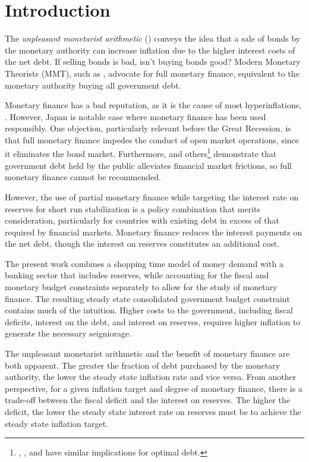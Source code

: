 \documentclass[]{article}
\begin{document}
\pagebreak

\onehalfspacing
\section{Introduction}
 
The \textit{unpleasant monetarist arithmetic} (\cite{sargent1981unpleasant}) conveys the idea that a sale of bonds by the monetary authority can increase inflation due to the higher interest costs of the net debt. If selling bonds is bad, isn't buying bonds good? Modern Monetary Theorists (MMT), such as \textcite{Kelton2020}, advocate for full monetary finance, equivalent to the monetary authority buying all government debt. 

Monetary finance has a bad reputation, as it is the cause of most hyperinflations, \textcite{sargent1982ends}. However, Japan is notable case where monetary finance has been used responsibly. One objection, particularly relevant before the Great Recession, is that full monetary finance impedes the conduct of open market operations, since it eliminates the bond market. Furthermore, \textcite{AIYAGARI98debt} and others\footnote{\textcite{Woodford90debt}, \textcite{Azzimonti2019debtwithbanks}, and \textcite{brunnermeier24safe} have similar implications for optimal debt.} demonstrate that government debt held by the public alleviates financial market frictions, so full monetary finance cannot be recommended.

However, the use of partial monetary finance while targeting the interest rate on reserves for short run stabilization is a policy combination that merits consideration, particularly for countries with existing debt in excess of that required by financial markets. Monetary finance reduces the interest payments on the net debt, though the interest on reserves constitutes an additional cost. 

The present work combines a shopping time model of money demand with a banking sector that includes reserves, while accounting for the fiscal and monetary budget constraints separately to allow for the study of monetary finance. The resulting steady state consolidated government budget constraint contains much of the intuition. Higher costs to the government, including fiscal deficits, interest on the debt, and interest on reserves, requires higher inflation to generate the necessary seigniorage.

The unpleasant monetarist arithmetic and the benefit of monetary finance are both apparent. The greater the fraction of debt purchased by the monetary authority, the lower the steady state inflation rate and vice versa. From another perspective, for a given inflation target and degree of monetary finance, there is a trade-off between the fiscal deficit and the interest on reserves. The higher the deficit, the lower the steady state interest rate on reserves must be to achieve the steady state inflation target.
\end{document}
